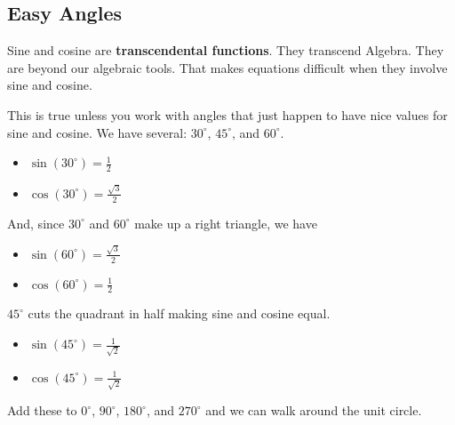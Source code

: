 \documentclass{ximera}
\begin{document}
\subsection*{Easy Angles}





Sine and cosine are \textbf{transcendental functions}.  They transcend Algebra. They are beyond our algebraic tools.  That makes equations difficult when they involve sine and cosine.


This is true unless you work with angles that just happen to have nice values for sine and cosine.  We have several: $30^{\circ}$, $45^{\circ}$, and $60^{\circ}$.




\begin{itemize}
\item $\sin(30^{\circ}) = \frac{1}{2}$
\item $\cos(30^{\circ}) = \frac{\sqrt{3}}{2}$
\end{itemize}


And, since $30^{\circ}$ and $60^{\circ}$ make up a right triangle, we have 


\begin{itemize}
\item $\sin(60^{\circ}) = \frac{\sqrt{3}}{2}$
\item $\cos(60^{\circ}) = \frac{1}{2}$
\end{itemize}




$45^{\circ}$ cuts the quadrant in half making sine and cosine equal.

\begin{itemize}
\item $\sin(45^{\circ}) = \frac{1}{\sqrt{2}}$
\item $\cos(45^{\circ}) = \frac{1}{\sqrt{2}}$
\end{itemize}



Add these to $0^{\circ}$, $90^{\circ}$, $180^{\circ}$, and $270^{\circ}$ and we can walk around the unit circle.
\end{document}
